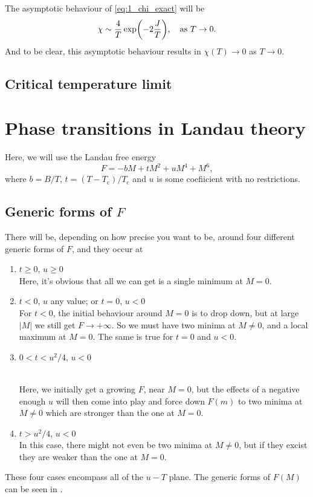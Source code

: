 \documentclass[11pt,letter, swedish, english
]{article}
\newcommand{\Tc}{\ensuremath{T_{\text{c}}}}
\begin{document}
The asymptotic behaviour of \eqref{eq:1_chi_exact} will be 
\begin{equation}
\chi\sim \frac{4}{T}\exp(-2\frac{J}{T})
\qcomma \text{as}\ T\to0.
\end{equation}
And to be clear, this asymptotic behaviour results in $\chi(T)\to0$ as
$T\to0$. 


\subsection{Critical temperature limit}






\section{Phase transitions in Landau theory}
\renewcommand{\thesubsection}{\arabic{section} (\alph{subsection})}
\renewcommand{\thesubsubsection}{\arabic{section} (\alph{subsection},\,\roman{subsubsection})}

Here, we will use the Landau free energy
\begin{equation}\label{eq:2_F(M)}
F=-bM+tM^2+uM^4+M^6,
\end{equation}
where $b=B/T$, $t=(T-\Tc)/\Tc$ and $u$ is some coefiicient with no
restrictions. 

\subsection{Generic forms of $F$}
There will be, depending on how precise you want to be, around four
different generic forms of $F$, and they occur at
\begin{enumerate}[label=\Roman*.]
\item $t\ge0$, $u\ge0$ \\
Here, it's obvious that all we can get is a single minimum at $M=0$.
\item $t<0$, $u$ any value; or $t=0$, $u<0$\\
For $t<0$, the initial behaviour around $M=0$ is to drop down, but at
large $|M|$ we still get $F\to+\infty$. So we must have two minima at
$M\neq0$, and a local maximum at $M=0$. The same is true for $t=0$ and
$u<0$. 
\item $0<t<u^2/4$, $u<0$\footnotemark{}\addtocounter{footnote}{-1}\\
Here, we initially get a growing $F$, near $M=0$, but the effects of a
negative enough $u$ will then come into play and force down $F(m)$ to
two minima at $M\neq0$ which are stronger than the one at $M=0$.
\item $t>u^2/4$, $u<0$\footnotemark{}\\
In this case, there might not even be two minima at $M\neq0$, but if
they excist they are weaker than the one at $M=0$.
\end{enumerate}
These four cases encompass all of the $u{-}T$ plane. The generic forms
of $F(M)$ can be seen in .
\end{document}
